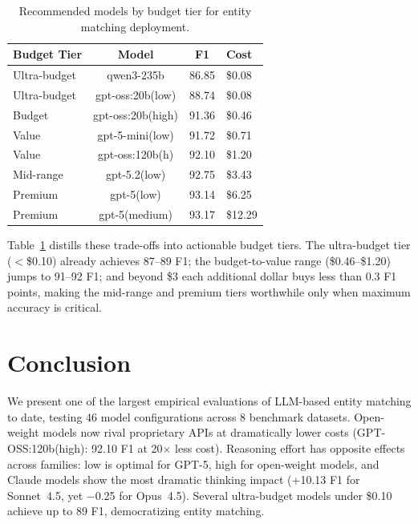 \documentclass[runningheads]{llncs}
\begin{document}
\begin{table}[!htbp]
\centering
\caption{Recommended models by budget tier for entity matching deployment.}
\label{tab:cost_tiers}
\small
\begin{tabular}{lccl}
\toprule
\textbf{Budget Tier} & \textbf{Model} & \textbf{F1} & \textbf{Cost} \\
\midrule
Ultra-budget & qwen3-235b        & 86.85 & \$0.08 \\
Ultra-budget & gpt-oss:20b(low)  & 88.74 & \$0.08 \\
Budget       & gpt-oss:20b(high) & 91.36 & \$0.46 \\
Value        & gpt-5-mini(low)   & 91.72 & \$0.71 \\
Value        & gpt-oss:120b(h)   & 92.10 & \$1.20 \\
Mid-range    & gpt-5.2(low)      & 92.75 & \$3.43 \\
Premium      & gpt-5(low)        & 93.14 & \$6.25 \\
Premium      & gpt-5(medium)     & 93.17 & \$12.29 \\
\bottomrule
\end{tabular}
\end{table}

Table~\ref{tab:cost_tiers} distills these trade-offs into actionable budget tiers. The ultra-budget tier ($<$\$0.10) already achieves 87--89 F1; the budget-to-value range (\$0.46--\$1.20) jumps to 91--92 F1; and beyond \$3 each additional dollar buys less than 0.3 F1 points, making the mid-range and premium tiers worthwhile only when maximum accuracy is critical.

\section{Conclusion}

We present one of the largest empirical evaluations of LLM-based entity matching to date, testing 46 model configurations across 8 benchmark datasets. Open-weight models now rival proprietary APIs at dramatically lower costs (GPT-OSS:120b(high): 92.10 F1 at 20$\times$ less cost). Reasoning effort has opposite effects across families: low is optimal for GPT-5, high for open-weight models, and Claude models show the most dramatic thinking impact (+10.13 F1 for Sonnet~4.5, yet $-$0.25 for Opus~4.5). Several ultra-budget models under \$0.10 achieve up to 89 F1, democratizing entity matching.
\end{document}
